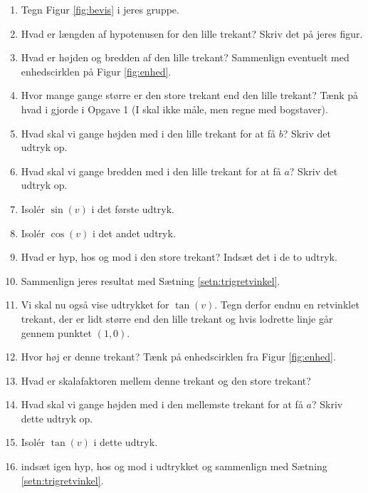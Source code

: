 \begin{enumerate}[label=\roman*)]
	\item Tegn Figur \ref{fig:bevis} i jeres gruppe. 
	\item Hvad er længden af hypotenusen for den lille trekant? Skriv det på jeres figur.
	\item Hvad er højden og bredden af den lille trekant? Sammenlign eventuelt med enhedscirklen på Figur \ref{fig:enhed}.
	\item Hvor mange gange større er den store trekant end den lille trekant? Tænk på hvad i gjorde i Opgave 1 (I skal ikke måle, men regne med bogstaver).
 	\item Hvad skal vi gange højden med i den lille trekant for at få $b$? Skriv det udtryk op.
 	\item Hvad skal vi gange bredden med i den lille trekant for at få $a$? Skriv det udtryk op.
	\item Isolér $\sin(v)$ i det første udtryk. 
	\item Isolér $\cos(v)$ i det andet udtryk.  
	\item Hvad er hyp, hos og mod i den store trekant? Indsæt det i de to udtryk. 
	\item Sammenlign jeres resultat med Sætning \ref{setn:trigretvinkel}.
	\item Vi skal nu også vise udtrykket for $\tan(v)$. Tegn derfor endnu en retvinklet trekant, der er lidt større end 
	den lille trekant og hvis lodrette linje går gennem punktet $(1,0)$. 
	\item Hvor høj er denne trekant? Tænk på enhedscirklen fra Figur \ref{fig:enhed}.
	\item Hvad er skalafaktoren mellem denne trekant og den store trekant?
	\item Hvad skal vi gange højden med i den mellemste trekant for at få $a$? Skriv dette udtryk op.
	\item Isolér $\tan(v)$ i dette udtryk.
	\item indsæt igen hyp, hos og mod i udtrykket og sammenlign med Sætning \ref{setn:trigretvinkel}.
\end{enumerate}

